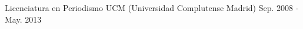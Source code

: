 

\begin{cventries}

  \cventry
    {Licenciatura en Periodismo} %
    {UCM (Universidad Complutense Madrid)} %
    {} %
    {Sep. 2008 - May. 2013} %
    {
    }

\end{cventries}
